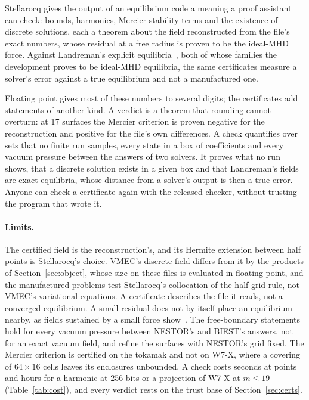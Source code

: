 \documentclass[11pt]{article}
\begin{document}
Stellarocq gives the output of an equilibrium code a meaning a proof assistant
can check: bounds, harmonics, Mercier stability terms and the existence of
discrete solutions, each a theorem about the field reconstructed from the
file's exact numbers, whose residual at a free radius is proven to be the
ideal-MHD force. Against Landreman's explicit equilibria~\cite{landreman2026},
both of whose
families the development proves to be ideal-MHD equilibria, the same
certificates measure a solver's error against a true equilibrium and not a
manufactured one.

Floating point gives most of these numbers to several digits; the certificates
add statements of another kind. A verdict is a theorem that rounding cannot
overturn: at 17 surfaces the Mercier criterion is proven negative for the
reconstruction and positive for the file's own differences. A check quantifies
over sets that no finite run samples, every state in a box of coefficients and
every vacuum pressure between the answers of two solvers. It proves what no run
shows, that a discrete solution exists in a given box and that Landreman's
fields are exact equilibria, whose distance from a solver's output is then a
true error. Anyone can check a certificate again with the released checker,
without trusting the program that wrote it.

\paragraph{Limits.}
The certified field is the reconstruction's, and its Hermite extension between
half points is Stellarocq's choice. VMEC's discrete field differs from it by
the products of Section~\ref{sec:object}, whose size on these files is
evaluated in floating point, and the manufactured problems test Stellarocq's
collocation of the half-grid rule, not VMEC's variational equations. A
certificate describes the file it reads, not a converged equilibrium. A small residual does not by itself place an equilibrium nearby, as
fields sustained by a small force show~\cite{constantin2021}. The free-boundary
statements hold for every vacuum pressure between NESTOR's and BIEST's answers,
not for an exact vacuum field, and refine the surfaces with NESTOR's grid
fixed. The Mercier
criterion is certified on the tokamak and not on W7-X, where a covering of
$64\times16$ cells leaves its enclosures unbounded. A check costs seconds at
points and hours for a harmonic at 256 bits or a projection of W7-X at
$m\le19$ (Table~\ref{tab:cost}), and every verdict rests on the trust base of
Section~\ref{sec:certs}.
\end{document}
